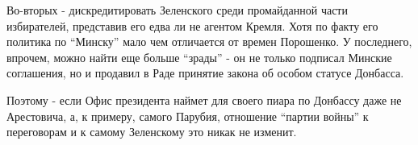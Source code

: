 Во-вторых - дискредитировать Зеленского среди промайданной части
избирателей, представив его едва ли не агентом Кремля. Хотя по факту его
политика по \enquote{Минску} мало чем отличается от времен Порошенко. У
последнего, впрочем, можно найти еще больше \enquote{зрады} - он не только
подписал Минские соглашения, но и продавил в Раде принятие закона об
особом статусе Донбасса. 

Поэтому - если Офис президента наймет для своего пиара по Донбассу даже не
Арестовича, а, к примеру, самого Парубия, отношение \enquote{партии войны} к
переговорам и к самому Зеленскому это никак не изменит.
